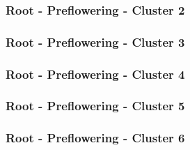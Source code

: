 \vspace{1em}



\clearpage

\subsubsection{Root - Preflowering - Cluster 2}

\vspace{1em}



\clearpage

\subsubsection{Root - Preflowering - Cluster 3}

\vspace{1em}



\clearpage

\subsubsection{Root - Preflowering - Cluster 4}

\vspace{1em}



\clearpage

\subsubsection{Root - Preflowering - Cluster 5}

\vspace{1em}



\clearpage

\subsubsection{Root - Preflowering - Cluster 6}

\vspace{1em}


